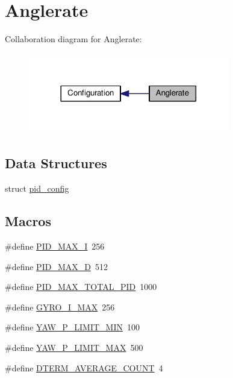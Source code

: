 \hypertarget{group__anglerate}{\section{Anglerate}
\label{group__anglerate}
}
Collaboration diagram for Anglerate\+:\nopagebreak
\begin{figure}[H]
\begin{center}
\leavevmode
\includegraphics[width=248pt]{group__anglerate}
\end{center}
\end{figure}
\subsection*{Data Structures}
\begin{DoxyCompactItemize}
\item 
struct \hyperlink{structpid__config}{pid\+\_\+config}
\end{DoxyCompactItemize}
\subsection*{Macros}
\begin{DoxyCompactItemize}
\item 
\#define \hyperlink{group__anglerate_gab4f1561b1faab900a2c3f98d8ed7a1a1}{P\+I\+D\+\_\+\+M\+A\+X\+\_\+\+I}~256
\item 
\#define \hyperlink{group__anglerate_ga8d24a34284111b503a14208f282e9b61}{P\+I\+D\+\_\+\+M\+A\+X\+\_\+\+D}~512
\item 
\#define \hyperlink{group__anglerate_ga56a1ffa38fbbd2d65a0692b214373529}{P\+I\+D\+\_\+\+M\+A\+X\+\_\+\+T\+O\+T\+A\+L\+\_\+\+P\+I\+D}~1000
\item 
\#define \hyperlink{group__anglerate_gad3a9f082ae799cce9d5dd9f97c2740a0}{G\+Y\+R\+O\+\_\+\+I\+\_\+\+M\+A\+X}~256
\item 
\#define \hyperlink{group__anglerate_ga9bc91fcc4757a889a9b6dc1208552c0e}{Y\+A\+W\+\_\+\+P\+\_\+\+L\+I\+M\+I\+T\+\_\+\+M\+I\+N}~100
\item 
\#define \hyperlink{group__anglerate_ga943cb589ce2e16951f78202b7202f2fe}{Y\+A\+W\+\_\+\+P\+\_\+\+L\+I\+M\+I\+T\+\_\+\+M\+A\+X}~500
\item 
\#define \hyperlink{group__anglerate_ga383105226fdce00e3639d6ff47932a0c}{D\+T\+E\+R\+M\+\_\+\+A\+V\+E\+R\+A\+G\+E\+\_\+\+C\+O\+U\+N\+T}~4
\end{DoxyCompactItemize}
